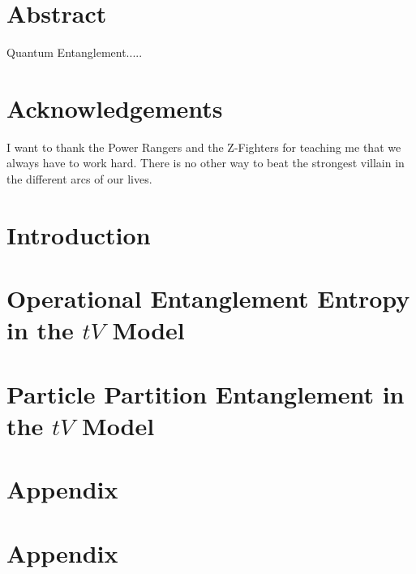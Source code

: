 \documentclass[12pt, two sided]{report}
\begin{document}




\chapter*{Abstract}
Quantum Entanglement.....

\chapter*{Acknowledgements}
I want to thank the Power Rangers and the Z-Fighters for teaching me that we always have to work hard. There is no other way to beat the strongest villain in the different arcs of our lives.

\tableofcontents

\chapter{Introduction}


\chapter{Operational Entanglement Entropy in the $tV$ Model}


\chapter{Particle Partition Entanglement in the $tV$ Model}



\appendix
\chapter{Appendix}


\chapter{Appendix}


{} 

\end{document}
